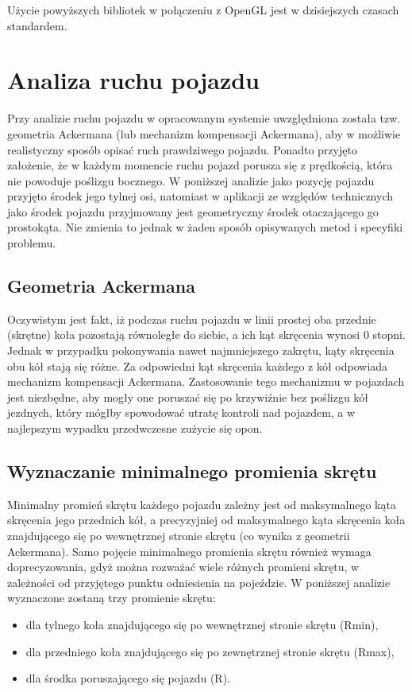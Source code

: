 \documentclass[a4paper,11pt,twoside]{report}
\theoremstyle{definition}
\begin{document}
Użycie powyższych bibliotek w połączeniu z OpenGL jest w dzisiejszych czasach standardem.

\chapter{Analiza ruchu pojazdu}

Przy analizie ruchu pojazdu w opracowanym systemie uwzględniona została tzw. geometria Ackermana (lub mechanizm kompensacji Ackermana), aby w możliwie realistyczny sposób opisać ruch prawdziwego pojazdu. Ponadto przyjęto założenie, że w każdym momencie ruchu pojazd porusza się z prędkością, która nie powoduje poślizgu bocznego. W poniższej analizie jako pozycję pojazdu przyjęto środek jego tylnej osi, natomiast w aplikacji ze względów technicznych jako środek pojazdu przyjmowany jest geometryczny środek otaczającego go prostokąta. Nie zmienia to jednak w żaden sposób opisywanych metod i specyfiki problemu.

\section{Geometria Ackermana}

Oczywistym jest fakt, iż podczas ruchu pojazdu w linii prostej oba przednie (skrętne) koła pozostają równoległe do siebie, a ich kąt skręcenia wynosi 0 stopni. Jednak w przypadku pokonywania nawet najmniejszego zakrętu, kąty skręcenia obu kół stają się różne. Za odpowiedni kąt skręcenia każdego z kół odpowiada mechanizm kompensacji Ackermana. Zastosowanie tego mechanizmu w pojazdach jest niezbędne, aby mogły one poruszać się po krzywiźnie bez poślizgu kół jezdnych, który mógłby spowodować utratę kontroli nad pojazdem, a w najlepszym wypadku przedwczesne zużycie się opon.


\section{Wyznaczanie minimalnego promienia skrętu}

Minimalny promień skrętu każdego pojazdu zależny jest od maksymalnego kąta skręcenia jego przednich kół, a precyzyjniej od maksymalnego kąta skręcenia koła znajdującego się po wewnętrznej stronie skrętu (co wynika z geometrii Ackermana). Samo pojęcie minimalnego promienia skrętu również wymaga doprecyzowania, gdyż można rozważać wiele różnych promieni skrętu, w zależności od przyjętego punktu odniesienia na pojeździe. W poniższej analizie wyznaczone zostaną trzy promienie skrętu:
\begin{itemize}
	\item dla tylnego koła znajdującego się po wewnętrznej stronie skrętu (Rmin),
	\item dla przedniego koła znajdującego się po zewnętrznej stronie skrętu (Rmax),
	\item dla środka poruszającego się pojazdu (R).
\end{itemize}
\end{document}
